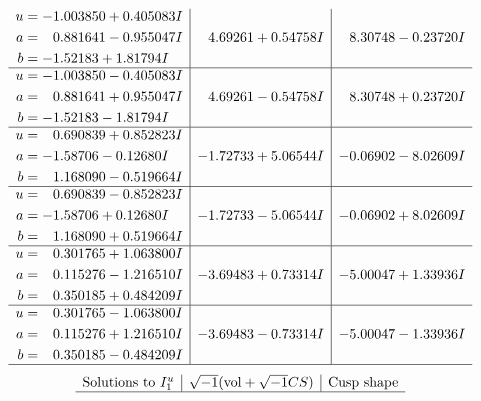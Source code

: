 \documentclass[1p]{elsarticle_modified}
\theoremstyle{definition}
\newcommand{\I}{\sqrt{-1}}
\begin{document}
$$\begin{array}{c|c|c}
\begin{aligned}
u &= -1.003850 + 0.405083 I \\
a &= \phantom{-}0.881641 - 0.955047 I \\
b &= -1.52183 + 1.81794 I\end{aligned}
 & \phantom{-}4.69261 + 0.54758 I & \phantom{-}8.30748 - 0.23720 I \\ \hline\begin{aligned}
u &= -1.003850 - 0.405083 I \\
a &= \phantom{-}0.881641 + 0.955047 I \\
b &= -1.52183 - 1.81794 I\end{aligned}
 & \phantom{-}4.69261 - 0.54758 I & \phantom{-}8.30748 + 0.23720 I \\ \hline\begin{aligned}
u &= \phantom{-}0.690839 + 0.852823 I \\
a &= -1.58706 - 0.12680 I \\
b &= \phantom{-}1.168090 - 0.519664 I\end{aligned}
 & -1.72733 + 5.06544 I & -0.06902 - 8.02609 I \\ \hline\begin{aligned}
u &= \phantom{-}0.690839 - 0.852823 I \\
a &= -1.58706 + 0.12680 I \\
b &= \phantom{-}1.168090 + 0.519664 I\end{aligned}
 & -1.72733 - 5.06544 I & -0.06902 + 8.02609 I \\ \hline\begin{aligned}
u &= \phantom{-}0.301765 + 1.063800 I \\
a &= \phantom{-}0.115276 - 1.216510 I \\
b &= \phantom{-}0.350185 + 0.484209 I\end{aligned}
 & -3.69483 + 0.73314 I & -5.00047 + 1.33936 I \\ \hline\begin{aligned}
u &= \phantom{-}0.301765 - 1.063800 I \\
a &= \phantom{-}0.115276 + 1.216510 I \\
b &= \phantom{-}0.350185 - 0.484209 I\end{aligned}
 & -3.69483 - 0.73314 I & -5.00047 - 1.33936 I\\
 \hline 
 \end{array}$$\newpage$$\begin{array}{c|c|c}  
\text{Solutions to }I^u_{1}& \I (\text{vol} + \sqrt{-1}CS) & \text{Cusp shape}\\
 \hline 

\end{array}$$
\end{document}
